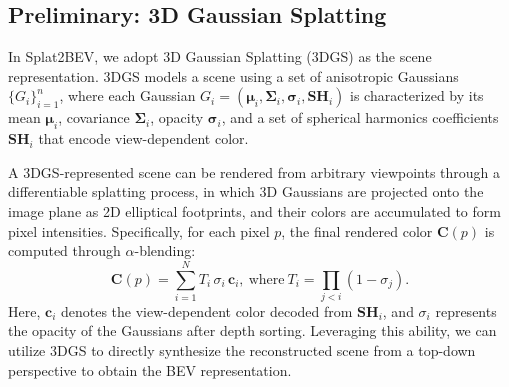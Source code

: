 \subsection{Preliminary: 3D Gaussian Splatting}
In Splat2BEV, we adopt 3D Gaussian Splatting (3DGS) as the scene representation. 
3DGS models a scene using a set of anisotropic Gaussians $\{G_i\}_{i=1}^n$, where each Gaussian $G_i = (\boldsymbol{\mu}_i, \boldsymbol{\Sigma}_i, \boldsymbol{\sigma}_i, \mathbf{SH}_i)$ is characterized by its mean  $\boldsymbol{\mu}_i$, covariance $\boldsymbol{\Sigma}_i$, 
opacity $\boldsymbol{\sigma}_i$, and a set of spherical harmonics coefficients $\mathbf{SH}_i$ that encode view-dependent color. 

A 3DGS-represented scene can be rendered from arbitrary viewpoints through a differentiable splatting process, 
in which 3D Gaussians are projected onto the image plane as 2D elliptical footprints, and their colors are accumulated to form pixel intensities. 
Specifically, for each pixel $p$, the final rendered color $\mathbf{C}(p)$ is computed through $\alpha$-blending:
\begin{equation}
    \mathbf{C}(p) = \sum_{i=1}^{N} T_i \, \sigma_i \, \mathbf{c}_i, 
    \  \text{where} \ 
    T_i = \prod_{j < i} (1 - \sigma_j).
    \label{eq:alpha_blending}
\end{equation}
Here, $\mathbf{c}_i$ denotes the view-dependent color decoded from $\mathbf{SH}_i$, 
and $\sigma_i$ represents the opacity of the Gaussians after depth sorting. 
Leveraging this ability, we can utilize 3DGS to directly synthesize the reconstructed scene from a top-down perspective to obtain the BEV representation.

